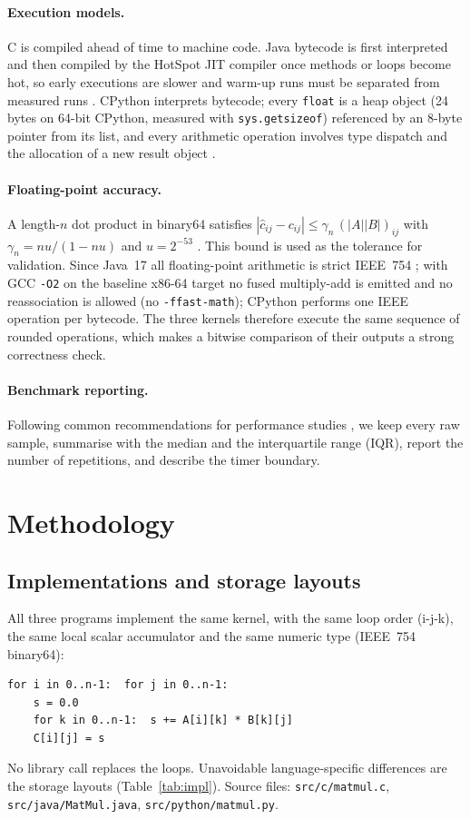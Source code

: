 \documentclass[10pt,a4paper]{article}
\begin{document}
\paragraph{Execution models.} C is compiled ahead of time to machine code. Java bytecode is
first interpreted and then compiled by the HotSpot JIT compiler once methods or loops become
hot, so early executions are slower and warm-up runs must be separated from measured runs
\cite{georges2007}. CPython interprets bytecode; every \texttt{float} is a heap object
(24 bytes on 64-bit CPython, measured with \texttt{sys.getsizeof}) referenced by an 8-byte
pointer from its list, and every arithmetic operation involves type dispatch and the
allocation of a new result object \cite{pythondatamodel}.

\paragraph{Floating-point accuracy.} A length-$n$ dot product in binary64 satisfies
$|\hat c_{ij}-c_{ij}|\le\gamma_n\,(|A||B|)_{ij}$ with $\gamma_n=nu/(1-nu)$ and $u=2^{-53}$
\cite{higham2002}. This bound is used as the tolerance for validation. Since Java~17 all
floating-point arithmetic is strict IEEE~754 \cite{jep306}; with GCC \texttt{-O2} on the
baseline x86-64 target no fused multiply-add is emitted and no reassociation is allowed
(no \texttt{-ffast-math}); CPython performs one IEEE operation per bytecode. The three kernels
therefore execute the same sequence of rounded operations, which makes a bitwise comparison
of their outputs a strong correctness check.

\paragraph{Benchmark reporting.} Following common recommendations for performance studies
\cite{hoefler2015,georges2007}, we keep every raw sample, summarise with the median and the
interquartile range (IQR), report the number of repetitions, and describe the timer boundary.

\section{Methodology}
\subsection{Implementations and storage layouts}
All three programs implement the same kernel, with the same loop order (i-j-k), the same
local scalar accumulator and the same numeric type (IEEE~754 binary64):
\begin{lstlisting}
for i in 0..n-1:  for j in 0..n-1:
    s = 0.0
    for k in 0..n-1:  s += A[i][k] * B[k][j]
    C[i][j] = s
\end{lstlisting}
No library call replaces the loops. Unavoidable language-specific differences are the
storage layouts (Table~\ref{tab:impl}). Source files: \texttt{src/c/matmul.c},
\texttt{src/java/MatMul.java}, \texttt{src/python/matmul.py}.
\end{document}
